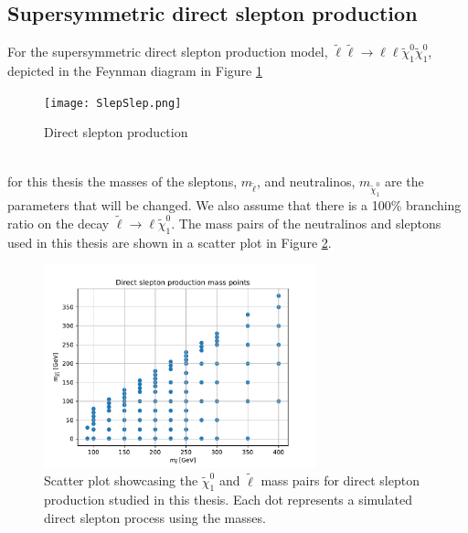 \documentclass[12pt, a4paper]{book}
\begin{document}
\subsection{Supersymmetric direct slepton production}
For the supersymmetric direct slepton production model, $\tilde{\ell}\tilde{\ell}\rightarrow \ell\ell\tilde{\chi}_1^0\tilde{\chi}_1^0$, depicted in the Feynman diagram in Figure \ref{fig:designer_got_me_slepslep}
\begin{figure}[!h]
    \centering
    \texttt{[image: SlepSlep.png]}
    \caption{Direct slepton production}\label{fig:designer_got_me_slepslep}
\end{figure}
\\for this thesis the masses of the sleptons, $m_{\tilde{\ell}}$, and neutralinos, $m_{\tilde{\chi}_1^0}$ are the parameters that will be changed. We also assume that there is a 100\% branching ratio on the decay $\tilde{\ell}\rightarrow \ell\tilde{\chi}_1^0$. 
The mass pairs of the neutralinos and sleptons used in this thesis are shown in a scatter plot in Figure \ref{fig:slepslep_mass}.
\graphicspath{{../../../Plots/2d_masses/}}
\begin{figure}[!ht]
    \centering
    \includegraphics[width=0.7\textwidth]{SlepSlep.pdf}
    \caption[$\tilde{\chi}_1^0$ and $\tilde{\ell}$ mass pairs for direct slepton production]{Scatter plot showcasing the $\tilde{\chi}_1^0$ and $\tilde{\ell}$ mass pairs for direct slepton production studied in this thesis. Each dot represents a simulated direct slepton process using the masses.}\label{fig:slepslep_mass}
\end{figure}
\graphicspath{{../../figures/}}
\end{document}
